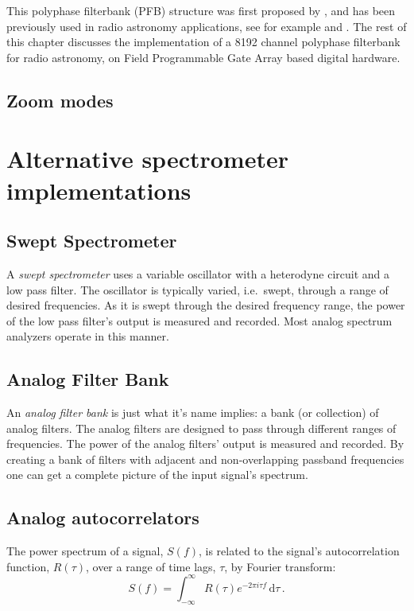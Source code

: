 \documentclass{ws-rv961x669}
\begin{document}
This polyphase filterbank (PFB) structure was first proposed by \citet{Bellanger:1976p7898},
and has been previously used in radio astronomy applications, see
for example \citet{Zimmerman:1991p6933} and \citet{Parsons:2006p257}.
The rest of this chapter discusses the implementation of a 8192 channel
polyphase filterbank for radio astronomy, on Field Programmable Gate
Array based digital hardware.

\subsection{Zoom modes}

\section{Alternative spectrometer implementations}

\subsection{Swept Spectrometer}\label{swept-spectrometer}

A \emph{swept spectrometer} uses a variable oscillator with a heterodyne
circuit and a low pass filter. The oscillator is typically varied,
i.e.~swept, through a range of desired frequencies. As it is swept
through the desired frequency range, the power of the low pass filter's
output is measured and recorded. Most analog spectrum analyzers operate
in this manner.

\subsection{Analog Filter Bank}\label{analog-filter-bank}

An \emph{analog filter bank} is just what it's name implies: a bank (or
collection) of analog filters. The analog filters are designed to pass
through different ranges of frequencies. The power of the analog
filters' output is measured and recorded. By creating a bank of filters
with adjacent and non-overlapping passband frequencies one can get a
complete picture of the input signal's spectrum.

\subsection{Analog autocorrelators}\label{autocorrelators}
The power spectrum of a signal, $S(f)$,  is related to the signal's autocorrelation function, $R(\tau)$, over a range of time lags, $\tau$, by Fourier transform:
\begin{equation}
\label{spec-from-autocorr}
 S(f) = \int_{-\infty}^{\infty} R(\tau)e^{-2\pi i \tau f} \,\mathrm{d}\tau \,.
\end{equation}
\end{document}
